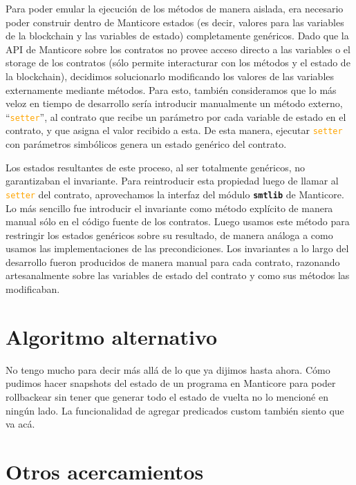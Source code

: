 Para poder emular la ejecución de los métodos de manera aislada, era necesario poder construir dentro de Manticore estados (es decir, valores para las variables de la blockchain y las variables de estado) completamente genéricos.
Dado que la API de Manticore sobre los contratos no provee acceso directo a las variables o el storage de los contratos (sólo permite interacturar con los métodos y el estado de la blockchain), decidimos solucionarlo modificando los valores de las variables externamente mediante métodos.
Para esto, también consideramos que lo más veloz en tiempo de desarrollo sería introducir manualmente un método externo, ``\textcolor{orange}{\texttt{setter}}'', al contrato que recibe un parámetro por cada variable de estado en el contrato, y que asigna el valor recibido a esta.
De esta manera, ejecutar \textcolor{orange}{\texttt{setter}} con parámetros simbólicos genera un estado genérico del contrato.

Los estados resultantes de este proceso, al ser totalmente genéricos, no garantizaban el invariante.
Para reintroducir esta propiedad luego de llamar al \textcolor{orange}{\texttt{setter}} del contrato, aprovechamos la interfaz del módulo \texttt{\textbf{smtlib}} de Manticore.
Lo más sencillo fue introducir el invariante como método explícito de manera manual sólo en el código fuente de los contratos.
Luego usamos este método para restringir los estados genéricos sobre su resultado, de manera análoga a como usamos las implementaciones de las precondiciones.
Los invariantes a lo largo del desarrollo fueron producidos de manera manual para cada contrato, razonando artesanalmente sobre las variables de estado del contrato y como sus métodos las modificaban.

\section{Algoritmo alternativo}
No tengo mucho para decir más allá de lo que ya dijimos hasta ahora.
Cómo pudimos hacer snapshots del estado de un programa en Manticore para poder rollbackear sin tener que generar todo el estado de vuelta no lo mencioné en ningún lado.
La funcionalidad de agregar predicados custom también siento que va acá.

\section{Otros acercamientos}
